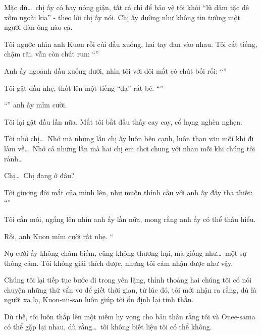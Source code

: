 \documentclass[../main.tex]{subfiles}
\begin{document}
Mặc dù\dots\ chị ấy có hay nóng giận, tất cả chỉ để bảo vệ tôi khỏi ``lũ dâm tặc dê xồm ngoài kia'' - theo lời chị ấy nói. Chị ấy dường như không tin tưởng một người đàn ông nào cả.

Tôi ngước nhìn anh Kuon rồi cúi đầu xuống, hai tay đan vào nhau. Tôi cất tiếng, chậm rãi, vẫn còn chút run: ``''

Anh ấy ngoảnh đầu xuống dưới, nhìn tôi với đôi mắt có chút bối rối: ``''

Tôi gật đầu nhẹ, thốt lên một tiếng ``dạ'' rất bé. ``''

``'' anh ấy mỉm cười.

Tôi lại gật đầu lần nữa. Mắt tôi bắt đầu thấy cay cay, cổ họng nghèn nghẹn.


Tôi nhớ chị\dots\ Nhớ mà những lần chị ấy luôn bên cạnh, luôn than vãn mỗi khi đi làm về\dots\ Nhớ cả những lần mà hai chị em chơi chung với nhau mỗi khi chúng tôi rảnh\dots

Chị\dots\ Chị đang ở đâu?

Tôi giương đôi mắt của mình lên, như muốn thỉnh cầu với anh ấy đầy tha thiết: ``''

Tôi cắn môi, ngẩng lên nhìn anh ấy lần nữa, mong rằng anh ấy có thể thấu hiểu.

Rồi, anh Kuon mỉm cười rất nhẹ. ``

Nụ cười ấy không châm biếm, cũng không thương hại, mà giống như\dots\ một sự thông cảm. Tôi không giải thích được, nhưng tôi cảm nhận được như vậy.

Chúng tôi lại tiếp tục bước đi trong yên lặng, thỉnh thoảng hai chúng tôi có nói chuyện những thứ vẩn vơ để giết thời gian, từ lúc đó, tôi mới nhận ra rằng, dù là người xa lạ, Kuon-nii-san luôn giúp tôi ổn định lại tinh thần.

Dù thế, tôi luôn thắp lên một niềm hy vọng cho bản thân rằng tôi và Onee-sama có thể gặp lại nhau, dù rằng\dots\ tôi không biết liệu tôi có thể không.
\end{document}

